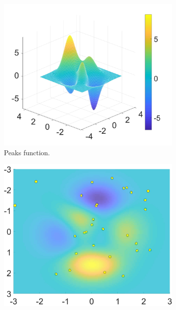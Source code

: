 \begin{figure}[hbp]
  \begin{subfigure}[b]{0.5\textwidth}
\includegraphics[width=\textwidth, height=\textwidth]{"Part 2 - Search-Based Optimization/Particle Swarm Optimization/Images/FIG1.1.jpg"}
    \caption{Peaks function.}
    \label{fig:f1}
  \end{subfigure}
  \hfill
  \begin{subfigure}[b]{0.5\textwidth}
    \includegraphics[width=\textwidth, height=\textwidth]{"Part 2 - Search-Based Optimization/Particle Swarm Optimization/Images/FIG2.1.jpg"}

\end{subfigure}
\end{figure}
